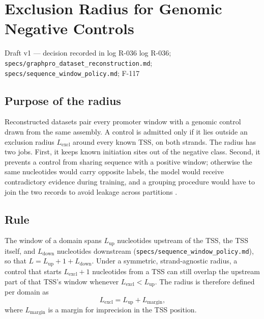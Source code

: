 
\section{Exclusion Radius for Genomic Negative Controls}\label{draft:exclusion-radius}

{Draft v1 --- decision recorded in log R-036}
{log R-036; \texttt{specs/graphpro\_dataset\_reconstruction.md};
\texttt{specs/sequence\_window\_policy.md}; F-117}

\subsection{Purpose of the radius}

Reconstructed datasets pair every promoter window with a genomic control drawn
from the same assembly. A control is admitted only if it lies outside an
exclusion radius $L_{\mathrm{excl}}$ around every known TSS, on both strands. The radius has
two jobs. First, it keeps known initiation sites out of the negative class.
Second, it prevents a control from sharing sequence with a positive window;
otherwise the same nucleotides would carry opposite labels, the model would
receive contradictory evidence during training, and a grouping procedure would
have to join the two records to avoid leakage across partitions
\citep{teufel2023graphpart,kapoor2023leakage}.

\subsection{Rule}

The window of a domain spans $L_{\mathrm{up}}$ nucleotides upstream of the TSS,
the TSS itself, and $L_{\mathrm{down}}$ nucleotides downstream
(\texttt{specs/sequence\_window\_policy.md}), so that
$L=L_{\mathrm{up}}+1+L_{\mathrm{down}}$. Under a symmetric, strand-agnostic
radius, a control that starts $L_{\mathrm{excl}}+1$ nucleotides from a TSS can
still overlap the upstream part of that TSS's window whenever
$L_{\mathrm{excl}} < L_{\mathrm{up}}$. The radius is therefore defined per
domain as
\begin{equation}
  L_{\mathrm{excl}} = L_{\mathrm{up}} + L_{\mathrm{margin}},
\end{equation}
where $L_{\mathrm{margin}}$ is a margin for imprecision in the TSS position.


